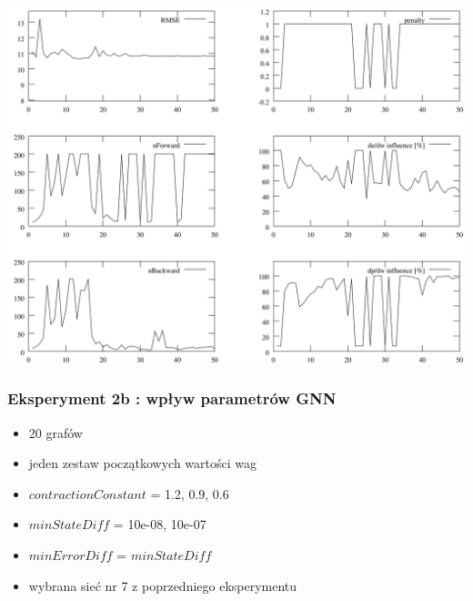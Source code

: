 \documentclass{beamer}
\begin{document}
\begin{frame}
	\includegraphics[scale=0.065]{img/gnn1_3}
\end{frame}

\begin{frame}
\frametitle{Eksperyment 2b : wpływ parametrów GNN}
\begin{itemize}
	\item 20 grafów
	\item jeden zestaw początkowych wartości wag
	\item $contractionConstant$ = 1.2, 0.9, 0.6
	\item $minStateDiff$ = 10e-08, 10e-07
	\item $minErrorDiff$ = $minStateDiff$
	\item wybrana sieć nr 7 z poprzedniego eksperymentu
\end{itemize}
\end{frame}
\end{document}
